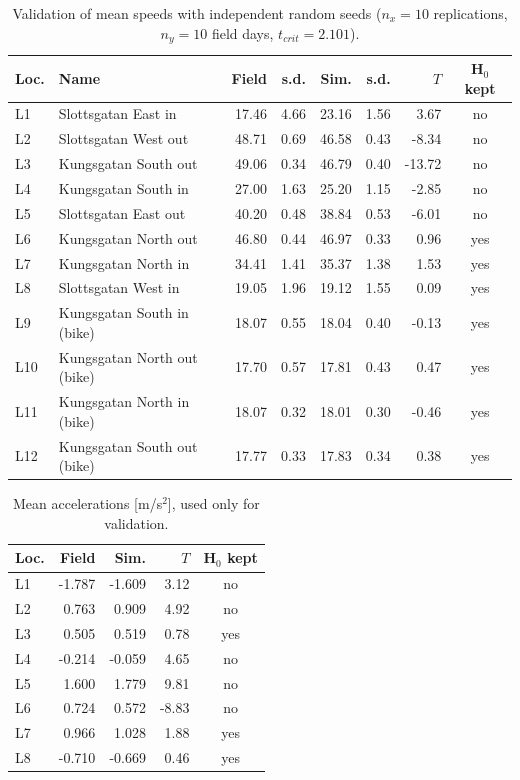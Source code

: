 \begin{table}[H]
\centering
\caption{Validation of mean speeds with independent random seeds ($n_x=10$ replications, $n_y=10$ field days, $t_{crit}=2.101$).}
\begin{tabular}{llrrrrrc}
\toprule
\textbf{Loc.} & \textbf{Name} & \textbf{Field} & \textbf{s.d.} & \textbf{Sim.} & \textbf{s.d.} & $T$ & \textbf{H$_0$ kept}\\
\midrule
L1 & Slottsgatan East in & 17.46 & 4.66 & 23.16 & 1.56 & 3.67 & no\\
L2 & Slottsgatan West out & 48.71 & 0.69 & 46.58 & 0.43 & -8.34 & no\\
L3 & Kungsgatan South out & 49.06 & 0.34 & 46.79 & 0.40 & -13.72 & no\\
L4 & Kungsgatan South in & 27.00 & 1.63 & 25.20 & 1.15 & -2.85 & no\\
L5 & Slottsgatan East out & 40.20 & 0.48 & 38.84 & 0.53 & -6.01 & no\\
L6 & Kungsgatan North out & 46.80 & 0.44 & 46.97 & 0.33 & 0.96 & yes\\
L7 & Kungsgatan North in & 34.41 & 1.41 & 35.37 & 1.38 & 1.53 & yes\\
L8 & Slottsgatan West in & 19.05 & 1.96 & 19.12 & 1.55 & 0.09 & yes\\
L9 & Kungsgatan South in (bike) & 18.07 & 0.55 & 18.04 & 0.40 & -0.13 & yes\\
L10 & Kungsgatan North out (bike) & 17.70 & 0.57 & 17.81 & 0.43 & 0.47 & yes\\
L11 & Kungsgatan North in (bike) & 18.07 & 0.32 & 18.01 & 0.30 & -0.46 & yes\\
L12 & Kungsgatan South out (bike) & 17.77 & 0.33 & 17.83 & 0.34 & 0.38 & yes\\
\bottomrule
\end{tabular}
\end{table}

\begin{table}[H]
\centering
\caption{Mean accelerations [m/s$^2$], used only for validation.}
\begin{tabular}{lrrrc}
\toprule
\textbf{Loc.} & \textbf{Field} & \textbf{Sim.} & $T$ & \textbf{H$_0$ kept}\\
\midrule
L1 & -1.787 & -1.609 & 3.12 & no\\
L2 & 0.763 & 0.909 & 4.92 & no\\
L3 & 0.505 & 0.519 & 0.78 & yes\\
L4 & -0.214 & -0.059 & 4.65 & no\\
L5 & 1.600 & 1.779 & 9.81 & no\\
L6 & 0.724 & 0.572 & -8.83 & no\\
L7 & 0.966 & 1.028 & 1.88 & yes\\
L8 & -0.710 & -0.669 & 0.46 & yes\\
\bottomrule
\end{tabular}
\end{table}